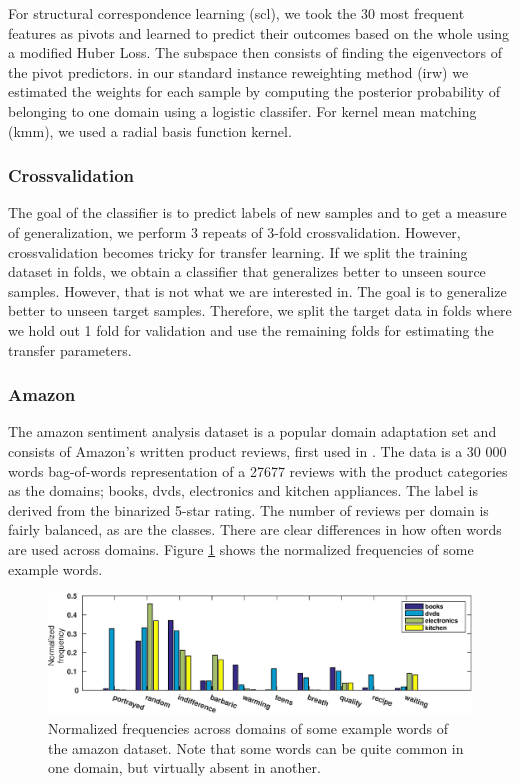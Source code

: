 \documentclass[twoside,11pt]{article}
\begin{document}
For structural correspondence learning (scl), we took the 30 most frequent features as pivots and learned to predict their outcomes based on the whole using a modified Huber Loss. The subspace then consists of finding the eigenvectors of the pivot predictors. in our standard instance reweighting method (irw) we estimated the weights for each sample by computing the posterior probability of belonging to one domain using a logistic classifer. For kernel mean matching (kmm), we used a radial basis function kernel. 

\subsubsection{Crossvalidation}
The goal of the classifier is to predict labels of new samples and to get a measure of generalization, we perform 3 repeats of 3-fold crossvalidation. However, crossvalidation becomes tricky for transfer learning. If we split the training dataset in folds, we obtain a classifier that generalizes better to unseen source samples. However, that is not what we are interested in. The goal is to generalize better to unseen target samples. Therefore, we split the target data in folds where we hold out 1 fold for validation and use the remaining folds for estimating the transfer parameters. 

\subsubsection{Amazon}
The amazon sentiment analysis dataset is a popular domain adaptation set and consists of Amazon's written product reviews, first used in \cite{blitzer2007biographies}. The data is a 30 000 words bag-of-words representation of a 27677 reviews with the product categories as the domains; books, dvds, electronics and kitchen appliances. The label is derived from the binarized 5-star rating. The number of reviews per domain is fairly balanced, as are the classes. There are clear differences in how often words are used across domains. Figure \ref{eg_amazon} shows the normalized frequencies of some example words. 

\begin{figure}[ht]
\centering
\includegraphics[width=\textwidth]{images/eg_amazon.eps}
\caption{Normalized frequencies across domains of some example words of the amazon dataset. Note that some words can be quite common in one domain, but virtually absent in another.}
\label{eg_amazon}
\end{figure}
\end{document}
